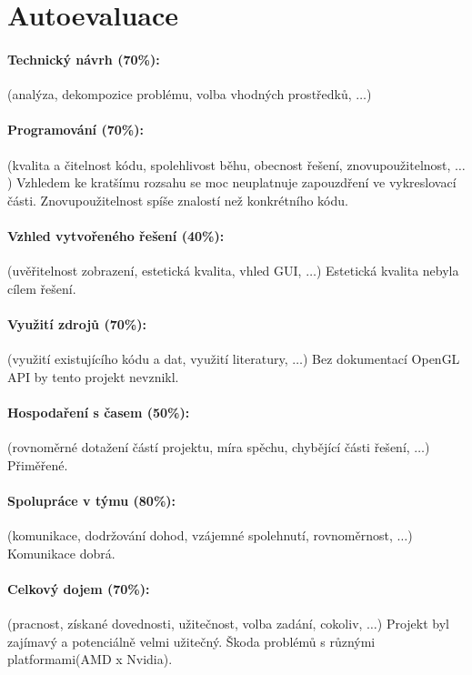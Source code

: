 \documentclass[11pt,a4paper]{article}
\begin{document}
\section{Autoevaluace}

\paragraph{Technický návrh (70\%):} (analýza, dekompozice problému, volba
vhodných prostředků, $\ldots$) 


\paragraph{Programování (70\%):} (kvalita a čitelnost kódu, spolehlivost běhu,
obecnost řešení, znovupoužitelnost, $\ldots$)
Vzhledem ke kratšímu rozsahu se moc neuplatnuje zapouzdření ve vykreslovací části. Znovupoužitelnost
spíše znalostí než konkrétního kódu.

\paragraph{Vzhled vytvořeného řešení (40\%):} (uvěřitelnost zobrazení,
estetická kvalita, vhled GUI, $\ldots$)
Estetická kvalita nebyla cílem řešení.

\paragraph{Využití zdrojů (70\%):} (využití existujícího kódu a dat, využití
literatury, $\ldots$)
Bez dokumentací OpenGL API by tento projekt nevznikl.

\paragraph{Hospodaření s časem (50\%):} (rovnoměrné dotažení částí projektu,
míra spěchu, chybějící části řešení, $\ldots$)
Přiměřené. 

\paragraph{Spolupráce v týmu (80\%):} (komunikace, dodržování dohod, vzájemné
spolehnutí, rovnoměrnost, $\ldots$)
Komunikace dobrá.

\paragraph{Celkový dojem (70\%):} (pracnost, získané dovednosti, užitečnost,
volba zadání, cokoliv, $\ldots$)
Projekt byl zajímavý a potenciálně velmi užitečný. Škoda problémů s různými platformami(AMD x Nvidia).
\end{document}
